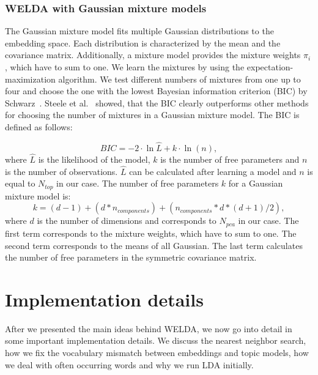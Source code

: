 \documentclass[
        a4paper,
        titlepage,
        twoside,
        parskip,
        numbers=noenddot
        ]{scrbook}
\theoremstyle{break}
\begin{document}
\subsubsection{WELDA with Gaussian mixture models}
The Gaussian mixture model fits multiple Gaussian distributions to the embedding space.
Each distribution is characterized by the mean and the covariance matrix.
Additionally, a mixture model provides the mixture weights $\pi_i$, which have to sum to one.
We learn the mixtures by using the expectation-maximization algorithm.
We test different numbers of mixtures from one up to four and choose the one with the lowest Bayesian information criterion (BIC) by Schwarz~\cite{Schwarz1978}.
Steele et al.~\cite{Steele2009} showed, that the BIC clearly outperforms other methods for choosing the number of mixtures in a Gaussian mixture model.
The BIC is defined as follows:

\begin{equation*}
  BIC = {-2 \cdot \ln{\hat L} + k \cdot \ln(n)},
\end{equation*}
where $\hat{L}$ is the likelihood of the model, $k$ is the number of free parameters and $n$ is the number of observations.
$\hat{L}$ can be calculated after learning a model and $n$ is equal to $N_{top}$ in our case.
The number of free parameters $k$ for a Gaussian mixture model is:
\begin{equation*}
  k = (d - 1) + (d * n_{components}) + (n_{components} * d * (d + 1)/2),
\end{equation*}
where $d$ is the number of dimensions and corresponds to $N_{pca}$ in our case.
The first term corresponds to the mixture weights, which have to sum to one.
The second term corresponds to the means of all Gaussian.
The last term calculates the number of free parameters in the symmetric covariance matrix.

\section{Implementation details}

After we presented the main ideas behind WELDA, we now go into detail in some important implementation details.
We discuss the nearest neighbor search, how we fix the vocabulary mismatch between embeddings and topic models, how we deal with often occurring words and why we run LDA initially.
\end{document}

